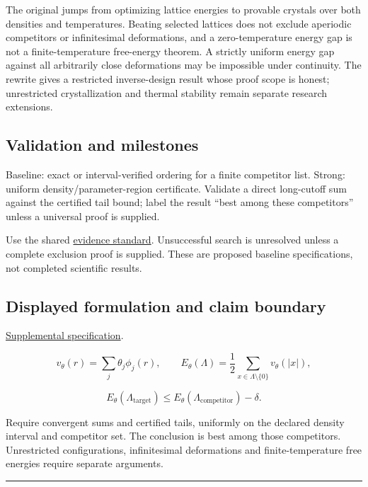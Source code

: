 \documentclass[
  11pt,
]{article}
\begin{document}
The original jumps from optimizing lattice energies to provable crystals
over both densities and temperatures. Beating selected lattices does not
exclude aperiodic competitors or infinitesimal deformations, and a
zero-temperature energy gap is not a finite-temperature free-energy
theorem. A strictly uniform energy gap against all arbitrarily close
deformations may be impossible under continuity. The rewrite gives a
restricted inverse-design result whose proof scope is honest;
unrestricted crystallization and thermal stability remain separate
research extensions.

\subsection{Validation and milestones}

Baseline: exact or interval-verified ordering for a finite competitor
list. Strong: uniform density/parameter-region certificate. Validate a
direct long-cutoff sum against the certified tail bound; label the
result ``best among these competitors'' unless a universal proof is
supplied.

Use the shared
\href{https://github.com/rick-stevens-ai/Pure-Thought/blob/main/reviews/EVIDENCE-STANDARD.md}{evidence
standard}. Unsuccessful search is unresolved unless a complete exclusion
proof is supplied. These are proposed baseline specifications, not
completed scientific results.

\subsection{Displayed formulation and claim boundary}

\href{https://github.com/rick-stevens-ai/Pure-Thought/blob/main/supplemental/S06.md}{Supplemental
specification}.

\[v_\theta(r)=\sum_j\theta_j\phi_j(r),\qquad
E_\theta(\Lambda)=\frac12\sum_{x\in\Lambda\setminus\{0\}}v_\theta(|x|),\]

\[E_\theta(\Lambda_{\mathrm{target}})\le
E_\theta(\Lambda_{\mathrm{competitor}})-\delta.\]

Require convergent sums and certified tails, uniformly on the declared
density interval and competitor set. The conclusion is best among those
competitors. Unrestricted configurations, infinitesimal deformations and
finite-temperature free energies require separate arguments.

\begin{center}\rule{0.5\linewidth}{0.5pt}\end{center}
\end{document}
